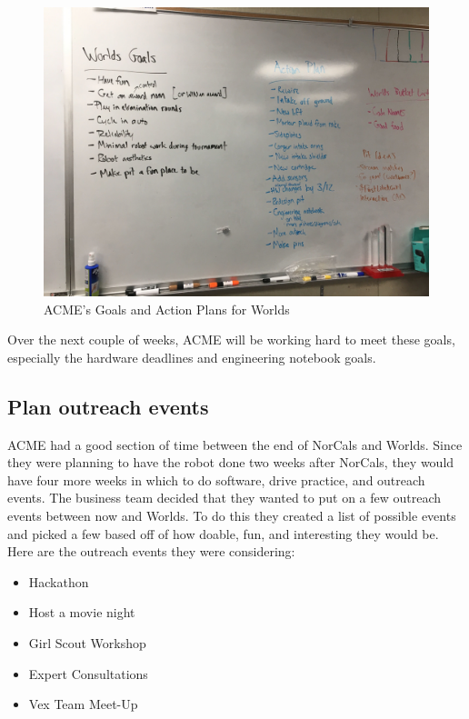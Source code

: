 \documentclass{article}
\begin{document}
\begin{figure}
    \centering
    \includegraphics[width= 0.5 \textwidth]{27_03-04/images/goalsandactionplan.JPG}
    \caption{ACME's Goals and Action Plans for Worlds}
    \label{fig:goals}
\end{figure}

Over the next couple of weeks, ACME will be working hard to meet these goals, especially the hardware deadlines and engineering notebook goals. \\

\subsection{Plan outreach events}
ACME had a good section of time between the end of NorCals and Worlds. Since they were planning to have the robot done two weeks after NorCals, they would have four more weeks in which to do software, drive practice, and outreach events. The business team decided that they wanted to put on a few outreach events between now and Worlds. To do this they created a list of possible events and picked a few based off of how doable, fun, and interesting they would be. Here are the outreach events they were considering:

\begin{itemize}
    \item Hackathon
    \item Host a movie night
    \item Girl Scout Workshop
    \item Expert Consultations
    \item Vex Team Meet-Up
\end{itemize}
\end{document}
